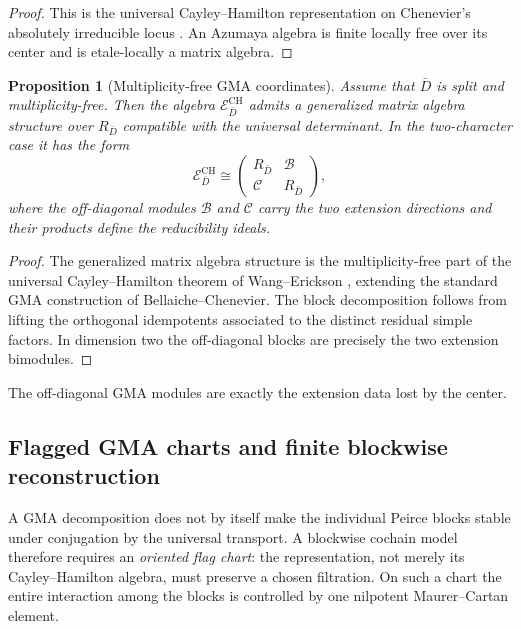 \documentclass[11pt]{article}
\newtheorem{proposition}[theorem]{Proposition}
\theoremstyle{definition}
\begin{document}
\begin{proof}
This is the universal Cayley--Hamilton representation on Chenevier's absolutely irreducible locus \cite{ChenevierDeterminants}.  An Azumaya algebra is finite locally free over its center and is etale-locally a matrix algebra.
\end{proof}

\begin{proposition}[Multiplicity-free GMA coordinates]\label{prop:ch-gma}
Assume that $\bar D$ is split and multiplicity-free.  Then the algebra
$\mathcal E^{\mathrm{CH}}_{\bar D}$ admits a generalized matrix algebra structure over
$R_{\bar D}$ compatible with the universal determinant.  In the two-character case it has the form
\[
\mathcal E^{\mathrm{CH}}_{\bar D}
\cong
\begin{pmatrix}
R_{\bar D} & \mathcal B\\
\mathcal C & R_{\bar D}
\end{pmatrix},
\]
where the off-diagonal modules $\mathcal B$ and $\mathcal C$ carry the two extension directions and their products define the reducibility ideals.
\end{proposition}

\begin{proof}
The generalized matrix algebra structure is the multiplicity-free part of the universal Cayley--Hamilton theorem of Wang--Erickson \cite{WangEricksonFamilies}, extending the standard GMA construction of Bellaiche--Chenevier.  The block decomposition follows from lifting the orthogonal idempotents associated to the distinct residual simple factors.  In dimension two the off-diagonal blocks are precisely the two extension bimodules.
\end{proof}

The off-diagonal GMA modules are exactly the extension data lost by the center.

\subsection{Flagged GMA charts and finite blockwise reconstruction}

A GMA decomposition does not by itself make the individual Peirce blocks stable under conjugation by the universal transport.  A blockwise cochain model therefore requires an \emph{oriented flag chart}: the representation, not merely its Cayley--Hamilton algebra, must preserve a chosen filtration.  On such a chart the entire interaction among the blocks is controlled by one nilpotent Maurer--Cartan element.
\end{document}
